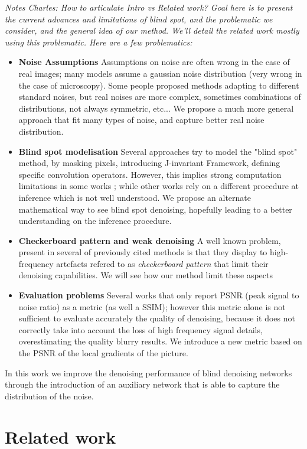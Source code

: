 \documentclass{article}
\begin{document}
\textit{Notes Charles: How to articulate Intro vs Related work? Goal here is to present the current advances and limitations of blind spot, and the problematic we consider, and the general idea of our method. We'll detail the related work mostly using this problematic. Here are a few problematics:}
\begin{itemize}
  \item \textbf{Noise Assumptions} Assumptions on noise are often wrong in the case of real images; many models assume a gaussian noise distribution (very wrong in the case of microscopy). Some people proposed methods adapting to different standard noises, but real noises are more complex, sometimes combinations of distributions, not always symmetric, etc... We propose a much more general approach that fit many types of noise, and capture better real noise distribution.
  \item \textbf{Blind spot modelisation} Several approaches try to model the "blind spot" method, by masking pixels, introducing J-invariant Framework, defining specific convolution operators. However, this implies strong computation limitations in some works ; while other works rely on a different procedure at inference which is not well understood. We propose an alternate mathematical way to see blind spot denoising, hopefully leading to a better understanding on the inference procedure.
  \item \textbf{Checkerboard pattern and weak denoising} A well known problem, present in several of previously cited methods is that they display to high-frequency artefacts refered to as \textit{checkerboard pattern} that limit their denoising capabilities. We will see how our method limit these aspects
  \item \textbf{Evaluation problems} Several works that only report PSNR (peak signal to noise ratio) as a metric (as well a SSIM); however this metric alone is not sufficient to evaluate accurately the quality of denoising, because it does not correctly take into account the loss of high frequency signal details, overestimating the quality blurry results. We introduce a new metric based on the PSNR of the local gradients of the picture.
\end{itemize}

In this work we improve the denoising performance of blind denoising networks through the introduction of an auxiliary network that is able to capture the distribution of the noise.

\section{Related work}
\label{sec:related}
\end{document}
